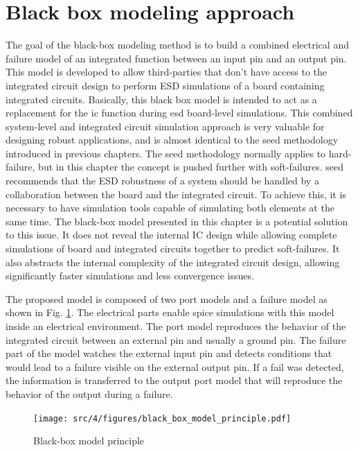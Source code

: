 \section{Black box modeling approach}

The goal of the black-box modeling method is to build a combined electrical and failure model of an integrated function between an input pin and an output pin.
This model is developed to allow third-parties that don't have access to the integrated circuit design to perform ESD simulations of a board containing integrated circuits.
Basically, this black box model is intended to act as a replacement for the \gls{ic} function during \gls{esd} board-level simulations.
This combined system-level and integrated circuit simulation approach is very valuable for designing robust applications, and is almost identical to the \gls{seed} \cite{seed} methodology introduced in previous chapters.
The \gls{seed} methodology normally applies to hard-failure, but in this chapter the concept is pushed further with soft-failures.
\gls{seed} recommends that the ESD robustness of a system should be handled by a collaboration between the board and the integrated circuit.
To achieve this, it is necessary to have simulation tools capable of simulating both elements at the same time.
The black-box model presented in this chapter is a potential solution to this issue.
It does not reveal the internal IC design while allowing complete simulations of board and integrated circuits together to predict soft-failures.
It also abstracts the internal complexity of the integrated circuit design, allowing significantly faster simulations and less convergence issues.

The proposed model is composed of two port models and a failure model as shown in Fig. \ref{fig:black-box-principle}.
The electrical parts enable \gls{spice} simulations with this model inside an electrical environment.
The port model reproduces the behavior of the integrated circuit between an external pin and usually a ground pin.
The failure part of the model watches the external input pin and detects conditions that would lead to a failure visible on the external output pin.
If a fail was detected, the information is transferred to the output port model that will reproduce the behavior of the output during a failure.

\begin{figure}[!h]
  \centering
  \texttt{[image: src/4/figures/black\_box\_model\_principle.pdf]}
  \caption{Black-box model principle}
  \label{fig:black-box-principle}
\end{figure}

